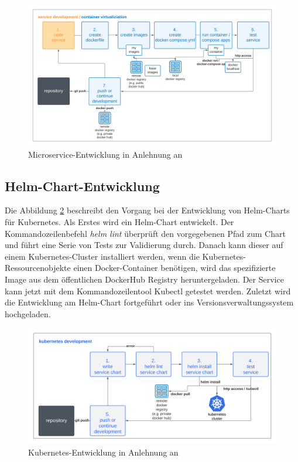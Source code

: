 \begin{figure}[!htb]
    \centering
    \includegraphics[width=1.0\columnwidth]{images/DevWorkflowDocker.png}
    \caption{Microservice-Entwicklung in Anlehnung an \cite{dockerappsworkflow}}
    \label{fig:DevWorkflowDocker}
\end{figure}


\subsection{Helm-Chart-Entwicklung}

Die Abbildung \ref{fig:DevWorkflowKubernetes} beschreibt den Vorgang bei der Entwicklung von Helm-Charts für Kubernetes.
Als Erstes wird ein Helm-Chart entwickelt.
Der Kommandozeilenbefehl \textit{helm lint} überprüft den vorgegebenen Pfad zum Chart und führt eine Serie von Tests zur Validierung durch.
Danach kann dieser auf einem Kubernetes-Cluster installiert werden, 
wenn die Kubernetes-Ressourcenobjekte einen Docker-Container benötigen,
wird das spezifizierte Image aus dem öffentlichen DockerHub Registry heruntergeladen.
Der Service kann jetzt mit dem Kommandozeilentool Kubectl getestet werden.
Zuletzt wird die Entwicklung am Helm-Chart fortgeführt oder ins Versionsverwaltungssystem hochgeladen.


\begin{figure}[!htb]
    \centering
    \includegraphics[width=1.0\columnwidth]{images/DevWorkflowKubernetes.png}
    \caption{Kubernetes-Entwicklung in Anlehnung an \cite{dockerappsworkflow}}
    \label{fig:DevWorkflowKubernetes}
\end{figure}



